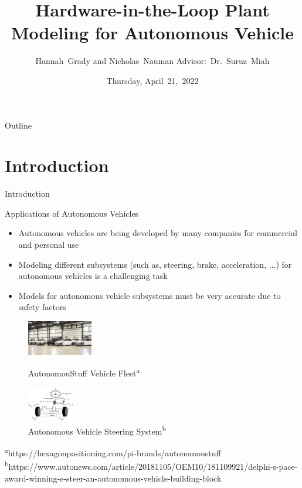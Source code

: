 \documentclass{beamer}
\title[HIL Plant Modeling]{Hardware-in-the-Loop Plant Modeling for Autonomous Vehicle}
\author[H.~Grady, N.~Nauman]{Hannah~Grady and Nicholas~Nauman 
\linebreak Advisor:~Dr.~Suruz~Miah}
\institute[Bradley University] %
{
  \inst{~}Department of Electrical and Computer Engineering\\
  Bradley University\\
  1501 W. Bradley Avenue\\
  Peoria, IL, 61625, USA
  \and
  \inst{~}\textbf{Sponsor:}~AutonomouStuff $|$~https://autonomoustuff.com/\\
  306 Erie Avenue, Morton, IL 61550\\
  Telephone:~309-291-0966, email:info.as.ap@hexagon.com
}
\date[April~21,~2022]{Thursday, April~21,~2022}
\begin{document}
\begin{frame}
  \titlepage
\end{frame}

\begin{frame}{Outline} 
  \tableofcontents%
\end{frame}

\section{Introduction}

\begin{frame}{Introduction}{}
	\begin{block}{Applications of Autonomous Vehicles}
    	\begin{itemize}
    		\item Autonomous vehicles are being developed by many companies for commercial and personal use
    		\item Modeling different subsystems (such as, steering, brake,
          acceleration, $\ldots$)  for autonomous vehicles is a challenging task
     		\item Models for autonomous vehicle subsystems must be very accurate due to safety factors
		\end{itemize}
    \end{block}
        \begin{figure}
			\centering
			\begin{minipage}[t]{0.4\textwidth}
				\centering
				\includegraphics[height=1.5cm]{figs/img/autonomousVehiclesAStuff}
				\caption{AutonomouStuff Vehicle Fleet\textsuperscript{a}}
				\label{fig:fleet}
			\end{minipage}
			\begin{minipage}[t]{0.4\textwidth}
				\centering
				\includegraphics[height=1.5cm]{figs/img/autonomousVehiclesSteering}
				\caption{Autonomous Vehicle Steering System\textsuperscript{b}}
				\label{fig:steerSystem}
			\end{minipage}
        \end{figure}
    \begin{tiny}
		\textsuperscript{a}https://hexagonpositioning.com/pi-brands/autonomoustuff\\\textsuperscript{b}https://www.autonews.com/article/20181105/OEM10/181109921/delphi-s-pace-award-winning-e-steer-an-autonomous-vehicle-building-block
    \end{tiny}
\end{frame}
\end{document}
